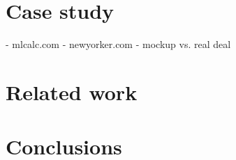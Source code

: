 \documentclass{llncs}
\begin{document}
\section{Case study}
\label{sec:case}

- mlcalc.com
- newyorker.com
- mockup vs. real deal

\section{Related work}
\label{sec:related}

\section{Conclusions}
\label{sec:conc}



\end{document}
